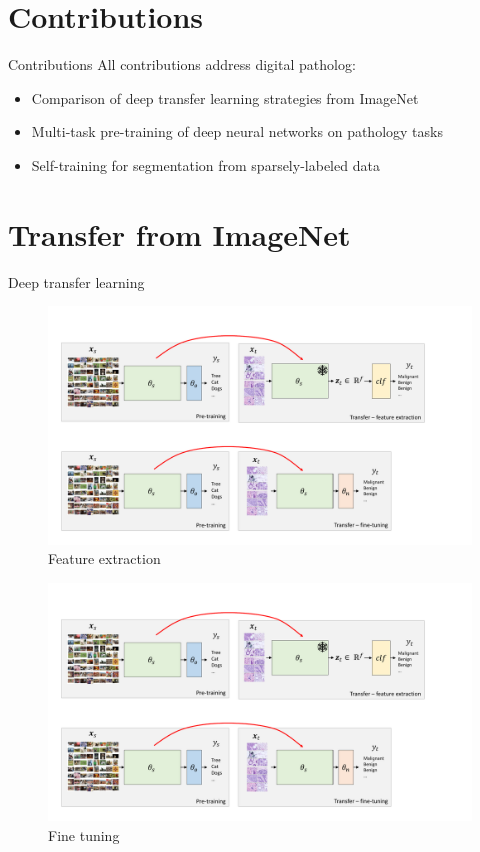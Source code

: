 \documentclass{beamer}
\begin{document}
\section{Contributions}

\begin{frame}{Contributions}
	All contributions address digital patholog:
	\begin{itemize}
		\item Comparison of deep transfer learning strategies from ImageNet
		\item Multi-task pre-training of deep neural networks on pathology tasks
		\item Self-training for segmentation from sparsely-labeled data
	\end{itemize}
\end{frame}

\section{Transfer from ImageNet}

\begin{frame}{Deep transfer learning}
	\begin{figure}
		\centering
		\includegraphics[width=\textwidth]{images/transfer-fe.pdf}
		\caption*{Feature extraction}
	\end{figure}
	\begin{figure}
		\centering
		\includegraphics[width=\textwidth]{images/transfer-ft.pdf}
		\caption*{Fine tuning}
	\end{figure}
\end{frame}
\end{document}
